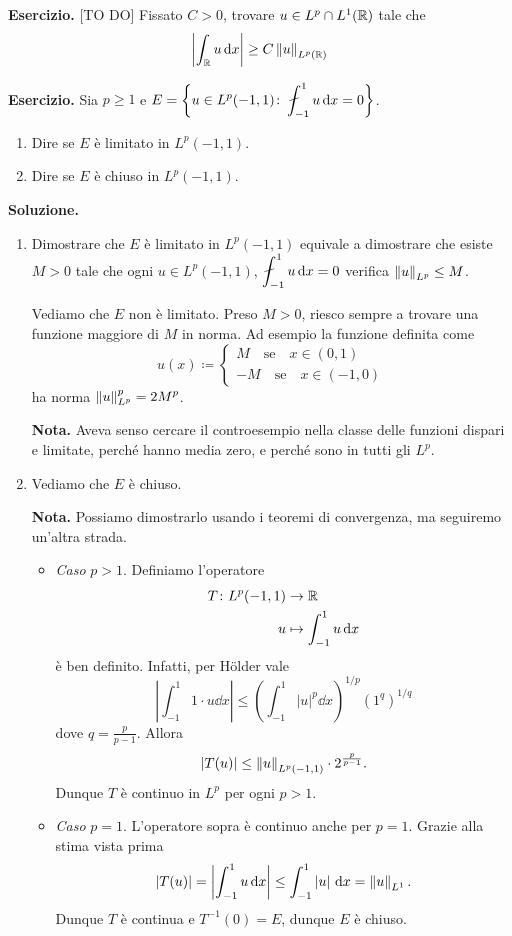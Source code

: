 \documentclass[a4paper, 12pt]{report}
\begin{document}
\textbf{Esercizio.} [TO DO] Fissato $C > 0$, trovare $u \in L^p \cap L^1 (\mathbb R)$ tale che
%
$$
\left| \int_{\mathbb R} u \,\mathrm{d} x\right| \geq C \left\lVert u \right\rVert_{L^p(\mathbb R)}
$$
%

\textbf{Esercizio.} Sia $p \geq 1$ e $\ds E = \left\{ u \in L^p(-1,1) \colon \fint_{-1}^1 u \dd x = 0 \right\}$.

\begin{enumerate}
\item Dire se $E$ è limitato in $L^p(-1,1)$.

\item Dire se $E$ è chiuso in $L^p(-1,1)$.
\end{enumerate}

\textbf{Soluzione.}
\begin{enumerate}
\item Dimostrare che $E$ è limitato in $L^p(-1,1)$ equivale a dimostrare che esiste $M > 0$ tale che ogni  $u \in L^p(-1,1)$, $\ds \fint_{-1}^1 u \dd x = 0$ verifica $\left\lVert u \right\rVert_{L^p} \leq M$.

Vediamo che $E$ non è limitato.
Preso $M > 0$, riesco sempre a trovare una funzione maggiore di $M$ in norma.
Ad esempio la funzione definita come
%
$$
u(x) \coloneqq
\begin{cases}
M \quad \text{se} \quad x \in (0,1) \\
-M \quad \text{se} \quad x \in (-1,0)
\end{cases} 
$$
%
ha norma $\displaystyle \left\lVert u \right\rVert_{L^p}^p = 2 M^p$.

\textbf{Nota.} Aveva senso cercare il controesempio nella classe delle funzioni dispari e limitate, perché hanno media zero, e perché sono in tutti gli $L^p$.

\item Vediamo che $E$ è chiuso.

\textbf{Nota.} Possiamo dimostrarlo usando i teoremi di convergenza, ma seguiremo un'altra strada.

\begin{itemize}
\item \textit{Caso} $p > 1$. Definiamo l'operatore 
\begin{align*}
T \colon L^p(-1,1) & \to \mathbb R \\
u & \mapsto \int_{-1}^{1} u \,\mathrm{d} x 
\end{align*}
è ben definito.
Infatti, per Hölder vale
%
$$
\left| \int_{-1}^{1} 1 \cdot u \dd x  \right| \leq \left( \int_{-1}^{1} \left| u \right|^p \dd x  \right)^{1/p} \left( 1^q \right)^{1/q}
$$
%
dove $q = \frac{p}{p-1}$.
Allora
$$
\left| T(u) \right| \leq \left\lVert u \right\rVert_{L^p(-1,1)} \cdot 2^{\frac{p}{p-1}}.
$$
%
Dunque $T$ è continuo in $L^p$ per ogni $p > 1$.

\item \textit{Caso} $p = 1$. L'operatore sopra è continuo anche per $p = 1$. Grazie alla stima vista prima
%
$$
\left| T(u) \right| = \left| \int_{-1}^{1} u \,\mathrm{d} x  \right| \leq \int_{-1}^{1} \left| u \right| \,\mathrm{d} x = \left\lVert u \right\rVert_{L^1}.
$$
%
Dunque $T$ è continua e $T^{-1}(0) = E$, dunque $E$ è chiuso.

\end{itemize}

\end{enumerate}
\end{document}
